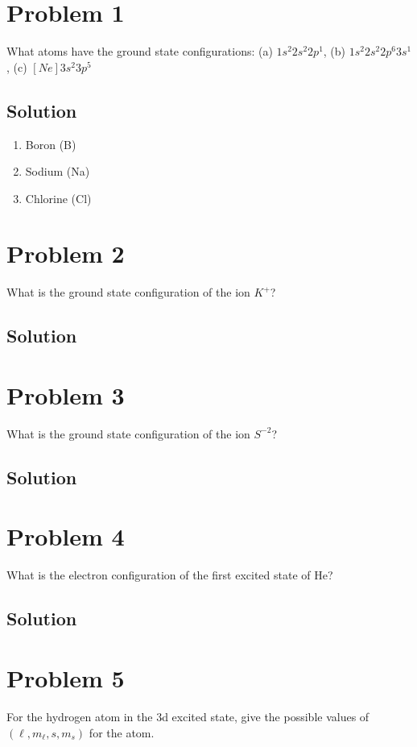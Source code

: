 \documentclass[12pt]{report}
\begin{document}
\pagebreak
\section*{Problem 1}
    What atoms have the ground state configurations: (a) $1s^2 2s^2 2p^1$, (b)  $1s^2 2s^2 2p^6 3s^1$, (c) $[Ne]3s^2 3p^5$

    \subsection*{Solution}
    \begin{enumerate}[label=(\alph*)]
        \item   Boron (B)
        \item   Sodium (Na)
        \item   Chlorine (Cl)
    \end{enumerate}

\section*{Problem 2}
    What is the ground state configuration of the ion $K^+$?

    \subsection*{Solution}

\section*{Problem 3}
    What is the ground state configuration of the ion $S^{-2}$?

    \subsection*{Solution}

\section*{Problem 4}
    What is the electron configuration of the first excited state of He?

    \subsection*{Solution}
    \pagebreak

\section*{Problem 5}
    For the hydrogen atom in the 3d excited state, give the possible values of $(\ell, m_\ell, s, m_s)$ for the atom.
\end{document}
